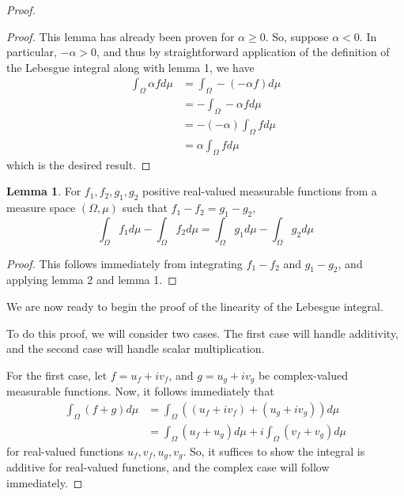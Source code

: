 \documentclass[fontsize=11pt]{scrartcl} %
\numberwithin{equation}{section} %
\numberwithin{figure}{section} %
\numberwithin{table}{section} %
\theoremstyle{definition}
\newtheorem{lemma}{Lemma}
\begin{document}
\begin{proof}
\begin{proof}
This lemma has already been proven for $\alpha\geq 0$. So, suppose $\alpha < 0$.
In particular, $-\alpha > 0$, and thus by straightforward application of the definition of
the Lebesgue integral along with lemma 1, we have
\[
\begin{aligned}
\int_{\Omega}\alpha fd\mu   &= \int_{\Omega}-(-\alpha f)d\mu\\
                            &= -\int_{\Omega}-\alpha fd\mu\\
                            &= -(-\alpha)\int_{\Omega} fd\mu\\
                            &= \alpha\int_{\Omega} fd\mu
\end{aligned}
\]
which is the desired result.
\end{proof}

\begin{lemma}
For $f_1,f_2,g_1,g_2$ positive real-valued measurable functions from a measure space
$(\Omega,\mu)$ such that $f_1-f_2 = g_1-g_2$,
\[
\int_{\Omega} f_1d\mu - \int_{\Omega} f_2d\mu = \int_{\Omega} g_1d\mu - \int_{\Omega}g_2d\mu
\]
\end{lemma}

\begin{proof}
This follows immediately from integrating $f_1-f_2$ and $g_1-g_2$, and applying lemma 2
and lemma 1.
\end{proof}
We are now ready to begin the proof of the linearity of the Lebesgue integral.

To do this proof, we will consider two cases. The first case will handle additivity,
and the second case will handle scalar multiplication.

For the first case, let $f=u_f+iv_f$, and $g=u_g+iv_g$ be complex-valued measurable functions.
Now, it follows immediately that
\[
\begin{aligned}
\int_{\Omega} (f+g)d\mu &= \int_{\Omega} ((u_f+iv_f) + (u_g+iv_g))d\mu\\
                        &= \int_{\Omega} (u_f + u_g)d\mu + i\int_{\Omega}(v_f+v_g)d\mu
\end{aligned}
\]
for real-valued functions $u_f,v_f,u_g,v_g$. So, it suffices to show the integral is
additive for real-valued functions, and the complex case will follow immediately.


\end{proof}
\end{document}
